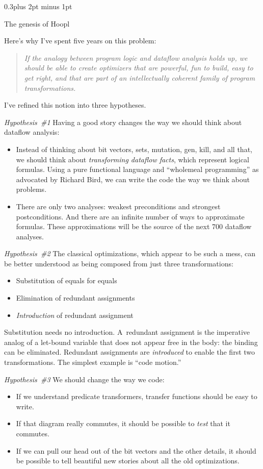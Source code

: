\documentclass[twocolumn]{article}
\makeatletter
\newcommand\mysection[1]{%
  \par
  \vskip 0.5\baselineskip plus 2pt minus 1pt
  \noindent{\raggedright\textbf{#1}}
  \par
  \vskip 0.3\baselineskip plus 2pt minus 1pt
  \@afterindentfalse
}
\renewcommand\mysection[1]{%
  \@startsection{section}{1}{\z@}{-0.5\baselineskip plus -2pt minus -1pt}%
                                   {0.3\baselineskip plus 2pt minus 1pt}%
           {\normalfont\raggedright\bfseries}}
\makeatother
\begin{document}
\mysection*{The genesis of Hoopl}

Here's why I've spent five years on this problem:
\begin{quote}
\emph{If
the analogy between program logic and dataflow analysis holds up,
we should be able to create optimizers that are powerful, fun to
build, easy to get right, and that are part of an intellectually
coherent family of program transformations.
}
\end{quote}
I've refined this notion into three hypotheses.

\emph{Hypothesis~\#1\quad} 
Having a good story changes the way we should think
about dataflow analysis:
\begin{itemize}
\item
Instead of thinking about bit vectors, sets, mutation, gen, kill, and
all that, we should think about \emph{transforming dataflow facts},
which represent logical formulas.
Using a pure functional language and ``wholemeal programming'' as
advocated by Richard Bird, we can write the code the way we think
about problems.
\item
There are only two analyses: weakest preconditions and strongest
postconditions.
And there are an infinite number of ways to approximate formulas.
These approximations will be the source of the next 700 dataflow
analyses.
\end{itemize}

\emph{Hypothesis~\#2\quad} 
The classical optimizations, which appear to be such a mess, can
be better understood as being composed from just three
transformations:
\begin{itemize}
\item
Substitution of equals for equals
\item
Elimination of redundant assignments
\item
\emph{Introduction} of redundant assignment
\end{itemize}
Substitution needs no introduction.
A~redundant assignment is the imperative analog of a let-bound
variable that does not appear free in the body: the binding can be
eliminated. 
Redundant assignments are \emph{introduced} to enable the first two
transformations. 
The simplest example is ``code motion.''


\emph{Hypothesis~\#3\quad} 
We should change the way we
code:
\begin{itemize}
\item
If we understand predicate transformers, transfer functions should be
easy to write.
\item
If that diagram really commutes, it should be possible to \emph{test}
that it commutes.
\item
If we can pull our head out of the bit vectors and the other details,
it should be possible to tell beautiful new stories about all the old
optimizations.
\end{itemize}
\end{document}
